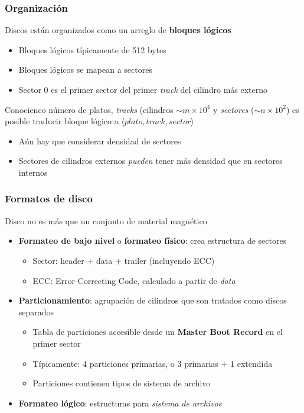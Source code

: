 \documentclass[letter]{beamer}
\begin{document}
\begin{frame}
  \frametitle{Organización}

  Discos están organizados como un arreglo de {\bf bloques lógicos}
  \begin{itemize}
    \item Bloques lógicos típicamente de 512 bytes
    \item Bloques lógicos se mapean a sectores
    \item Sector 0 es el primer sector del primer {\em track} del cilindro más externo
  \end{itemize}

  Conocienco número de platos, {\em tracks} (cilindros $\sim m \times 10^4$ y {\em sectores} ($\sim n \times 10^2$) es posible traducir
  bloque lógico a $\langle \mathit{plato}, \mathit{track}, \mathit{sector} \rangle$
  \begin{itemize}
    \item Aún hay que considerar densidad de sectores
    \item Sectores de cilindros externos {\em pueden} tener más densidad que en sectores internos
  \end{itemize}

\end{frame}

\begin{frame}
  \frametitle{Formatos de disco}

  Disco no es más que un conjunto de material magnético
  
  \begin{itemize}
    \item {\bf Formateo de bajo nivel} o {\bf formateo físico}: crea estructura de sectores
      \begin{itemize}
        \item Sector: header + data + trailer (incluyendo ECC)
        \item ECC: Error-Correcting Code, calculado a partir de {\em data}
      \end{itemize}
    \item {\bf Particionamiento}: agrupación de cilindros que son tratados como discos separados
      \begin{itemize}
        \item Tabla de particiones accesible desde un {\bf Master Boot Record} en el primer sector
        \item Típicamente: 4 particiones primarias, o 3 primarias + 1 extendida
        \item Particiones contienen tipos de sistema de archivo
      \end{itemize}
    \item {\bf Formateo lógico}: estructuras para {\em sistema de archivos}
  \end{itemize}

\end{frame}
\end{document}

